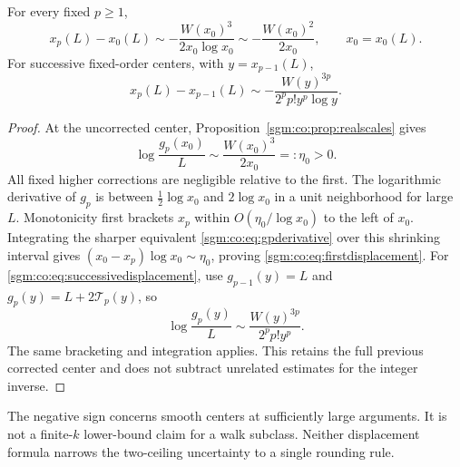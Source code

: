 \documentclass[11pt,letterpaper]{article}
\theoremstyle{remark}\newtheorem{remark}[theorem]{Remark}
\theoremstyle{definition}\newtheorem{definition}[theorem]{Definition}
\begin{document}
\begin{corollary}\label{sgm:co:cor:displacements}
For every fixed $p\ge1$,
\begin{equation}\label{sgm:co:eq:firstdisplacement}
 x_p(L)-x_0(L)\sim
 -\frac{W(x_0)^3}{2x_0\log x_0}
 \sim-\frac{W(x_0)^2}{2x_0},\qquad x_0=x_0(L).
\end{equation}
For successive fixed-order centers, with $y=x_{p-1}(L)$,
\begin{equation}\label{sgm:co:eq:successivedisplacement}
 x_p(L)-x_{p-1}(L)\sim
 -\frac{W(y)^{3p}}{2^p p!y^p\log y}.
\end{equation}
\end{corollary}
\begin{proof}
At the uncorrected center, Proposition~\ref{sgm:co:prop:realscales} gives
\[
 \log\frac{g_p(x_0)}L\sim\frac{W(x_0)^3}{2x_0}=:\eta_0>0.
\]
All fixed higher corrections are negligible relative to the first. The logarithmic derivative of $g_p$ is between $\tfrac12\log x_0$ and $2\log x_0$ in a unit neighborhood for large $L$. Monotonicity first brackets $x_p$ within $O(\eta_0/\log x_0)$ to the left of $x_0$. Integrating the sharper equivalent \eqref{sgm:co:eq:gpderivative} over this shrinking interval gives $(x_0-x_p)\log x_0\sim\eta_0$, proving \eqref{sgm:co:eq:firstdisplacement}. For \eqref{sgm:co:eq:successivedisplacement}, use $g_{p-1}(y)=L$ and $g_p(y)=L+2\mathcal T_p(y)$, so
\[
 \log\frac{g_p(y)}L\sim\frac{W(y)^{3p}}{2^p p!y^p}.
\]
The same bracketing and integration applies. This retains the full previous corrected center and does not subtract unrelated estimates for the integer inverse.
\end{proof}
The negative sign concerns smooth centers at sufficiently large arguments. It is not a finite-$k$ lower-bound claim for a walk subclass. Neither displacement formula narrows the two-ceiling uncertainty to a single rounding rule.
\end{document}
